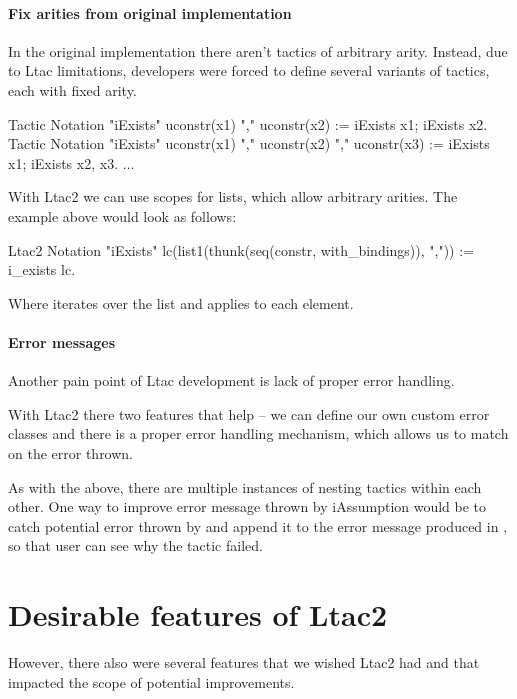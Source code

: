 \paragraph{Fix arities from original implementation}

In the original implementation there aren't tactics of arbitrary arity.
Instead, due to Ltac limitations, developers were forced to define several variants of tactics, each with fixed arity.

\begin{coq}
Tactic Notation "iExists" uconstr(x1) "," uconstr(x2) :=
  iExists x1; iExists x2.
Tactic Notation "iExists" uconstr(x1) "," uconstr(x2) "," uconstr(x3) :=
  iExists x1; iExists x2, x3.
$\ldots$
\end{coq}

With Ltac2 we can use scopes for lists, which allow arbitrary arities.
The example above would look as follows:

\begin{coq}
  Ltac2 Notation "iExists" lc(list1(thunk(seq(constr, with_bindings)), ",")) :=
  i_exists$\text{~}$lc.
\end{coq}

Where  iterates over the list and applies  to each element.

\paragraph{Error messages}

Another pain point of Ltac development is lack of proper error handling.

With Ltac2 there two features that help -- we can define our own custom error classes and there is a proper error handling mechanism, which allows us to match on the error thrown.

As with the  above, there are multiple instances of nesting tactics within each other.
One way to improve error message thrown by iAssumption would be to catch potential error thrown by  and append it to the error message produced in , so that user can see why the tactic failed.

\section{Desirable features of Ltac2}

However, there also were several features that we wished Ltac2 had and that impacted the scope of potential improvements.

